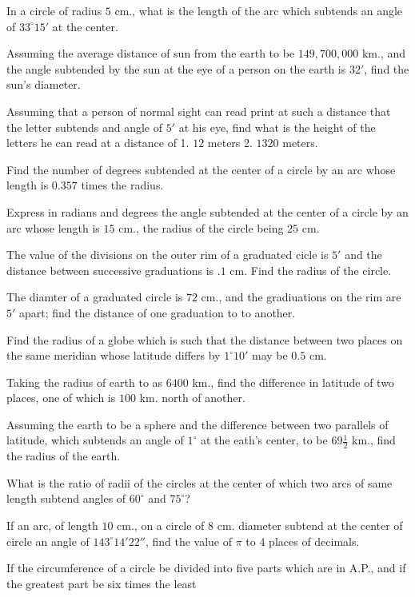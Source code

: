 \item In a circle of radius $5$ cm., what is the length of the arc which subtends an angle of $33^\circ15'$ at the center.
\item Assuming the average distance of sun from the earth to be $149,700,000$ km., and the angle subtended by the sun at the
    eye of a person on the earth is $32'$, find the sun's diameter.
\item Assuming that a person of normal sight can read print at such a distance that the letter subtends and angle of $5'$ at
    his eye, find what is the height of the letters he can read at a distance of 1. $12$ meters 2. $1320$ meters.
\item Find the number of degrees subtended at the center of a circle by an arc whose length is $0.357$ times the radius.
\item Express in radians and degrees the angle subtended at the center of a circle by an arc whose length is $15$ cm., the
    radius of the circle being $25$ cm.
\item The value of the divisions on the outer rim of a graduated cicle is $5'$ and the distance between successive graduations
    is $.1$ cm. Find the radius of the circle.
\item The diamter of a graduated circle is $72$ cm., and the gradiuations on the rim are $5'$ apart; find the distance of
    one graduation to to another.
\item Find the radius of a globe which is such that the distance between two places on the same meridian whose latitude differs by
    $1^\circ10'$ may be $0.5$ cm.
\item Taking the radius of earth to as $6400$ km., find the difference in latitude of two places, one of which is $100$
    km. north of another.
\item Assuming the earth to be a sphere and the difference between two parallels of latitude, which subtends an angle of
    $1^\circ$ at the eath's center, to be $69\frac{1}{2}$ km., find the radius of the earth.
\item What is the ratio of radii of the circles at the center of which two arcs of same length subtend angles of $60^\circ$ and
    $75^\circ$?
\item If an arc, of length $10$ cm., on a circle of $8$ cm. diameter subtend at the center of circle an angle of
    $143^\circ14'22''$, find the value of $\pi$ to $4$ places of decimals.
\item If the circumference of a circle be divided into five parts which are in A.P., and if the greatest part be six times the least
